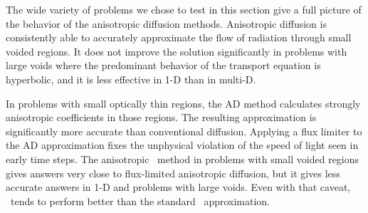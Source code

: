 The wide variety of problems we chose to test in this section give a full
picture of the behavior of the anisotropic diffusion methods. Anisotropic
diffusion is consistently able to accurately approximate the flow of radiation
through small voided regions. It does not improve the solution significantly in
problems with large voids where the predominant behavior of the transport
equation is hyperbolic, and it is less effective in 1-D than in multi-D.

In problems with small optically thin regions, the AD method calculates strongly
anisotropic coefficients in those regions. The resulting approximation is
significantly more accurate than conventional diffusion. Applying a flux limiter
to the AD approximation fixes the unphysical violation of the speed of light
seen in early time steps. The anisotropic \Pone\ method in problems with
small voided regions gives answers very close to flux-limited anisotropic
diffusion, but it gives less accurate answers in 1-D and problems with large
voids. Even with that caveat, \APone\ tends to perform better than the standard
\Pone\ approximation.

